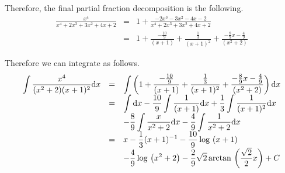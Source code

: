 {Therefore, the final partial fraction decomposition is the following. 
\[\begin{array}{rcl}
\displaystyle \frac{x^{4}}{x^{4}+2x^{3}+3x^{2}+4x +2}&=&\displaystyle 1+ \frac{-2x^{3}- 3x^{2}-4x -2}{x^{4}+2x^{3}+3x^{2}+4x +2}\\
&=&\displaystyle 1+ \frac{-\frac{10}{9}}{(x +1)}+\frac{\frac{1}{3}}{(x +1)^{2}}+\frac{-\frac{8}{9}x -\frac{4}{9}}{(x^{2}+2)}
\end{array}
\]

Therefore we can integrate as follows.
\[
\begin{array}{rcl}
\displaystyle \int \frac{x^4}{(x^2+2)(x+1)^2} {\normalfont \text{d}} x &=&\displaystyle \int \left( 1+ \frac{-\frac{10}{9}}{(x +1)}+\frac{\frac{1}{3}}{(x +1)^{2}}+\frac{-\frac{8}{9}x -\frac{4}{9}}{(x^{2}+2)}\right){\normalfont \text{d}} x\\
&=&\displaystyle \int {\normalfont \text{d}} x-\frac{10}{9}\int \frac{1}{(x +1)}{\normalfont \text{d}} x + \frac{ 1}{3}\int \frac{ 1}{(x +1)^{2}}{\normalfont \text{d}} x \\
&&\displaystyle -\frac{8}{9} \int \frac{x}{x^{2}+2}{\normalfont \text{d}} x-\frac{4}{9} \int \frac{ 1}{x^{2}+2}{\normalfont \text{d}} x \\
&=&\displaystyle x -\frac{1}{3} (x+1)^{-1}-\frac{10}{9} \log{}\left(x+1\right)\\
&&\displaystyle -\frac{4}{9} \log{}\left(x^{2} +2\right) -\frac{ 2}{ 9} \sqrt{ 2} \arctan{}\left(\frac{\sqrt{2}}{2} x\right)+C
\end{array}
\]
}



